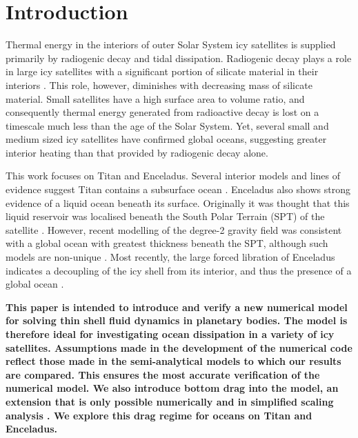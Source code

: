 \newpage
\section{Introduction}


Thermal energy in the interiors of outer Solar System icy satellites is supplied primarily by radiogenic decay and tidal dissipation. Radiogenic decay plays a role in large icy satellites with a significant portion of silicate material in their interiors \citep{hussmann2006subsurface}. This role, however, diminishes with decreasing mass of silicate material. Small satellites have a high surface area to volume ratio, and consequently thermal energy generated from radioactive decay is lost on a timescale much less than the age of the Solar System. Yet, several small and medium sized icy satellites have confirmed global oceans, suggesting greater interior heating than that provided by radiogenic decay alone. 

This work focuses on Titan and Enceladus. Several interior models and lines of evidence suggest Titan contains a subsurface ocean \citep{sohl2003interior, bills2011rotational, iess2012tides, baland2014titan, mitri2014shape, sohl2014structural}. Enceladus also shows strong evidence of a liquid ocean beneath its surface. Originally it was thought that this liquid reservoir was localised beneath the South Polar Terrain (SPT) of the satellite \citep[e.g.,][]{collins2007enceladus}. However, recent modelling of the degree-2 gravity field was consistent with a global ocean with greatest thickness beneath the SPT, although such models are non-unique \citep{iess2014gravity,mckinnon2015effect}. Most recently, the large forced libration of Enceladus indicates a decoupling of the icy shell from its interior, and thus the presence of a global ocean \citep{thomas2016enceladus}.  

\textbf{This paper is intended to introduce and verify a new numerical model for solving thin shell fluid dynamics in planetary bodies. The model is therefore ideal for investigating ocean dissipation in a variety of icy satellites. Assumptions made in the development of the numerical code reflect those made in the semi-analytical models to which our results are compared. This ensures the most accurate verification of the numerical model. We also introduce bottom drag into the model, an extension that is only possible numerically and in simplified scaling analysis \citep{chen2013tidal}. We explore this drag regime for oceans on Titan and Enceladus.}

